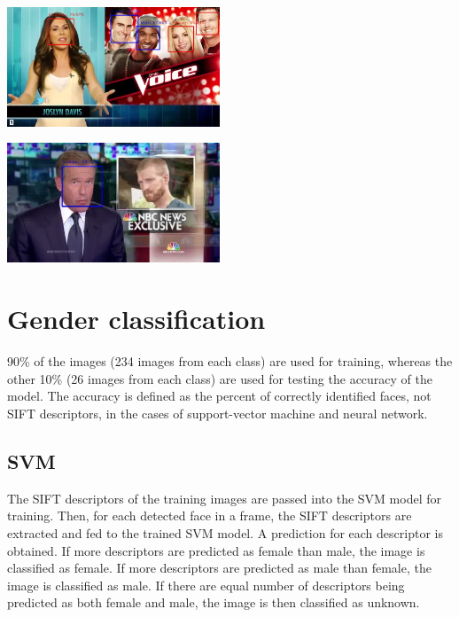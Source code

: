 \documentclass{article}
\begin{document}
\vspace*{10pt}
\begin{minipage}{0.5\linewidth}
 \label{fig: face_good}
\centering
\includegraphics[width=2.5in]{../output/clip_2/069.jpg}
\end{minipage}
\begin{minipage}{0.5\linewidth}
 \label{fig: face_bad}
\centering
\includegraphics[width=2.5in]{../output/clip_1_face/110.jpg}
\end{minipage}
\vspace*{10pt}

\section{Gender classification}
90\% of the images (234 images from each class) are used for training, whereas the other 10\% (26 images from each class) are used for testing the accuracy of the model. The accuracy is defined as the percent of correctly identified faces, not SIFT descriptors, in the cases of support-vector machine and neural network.

\subsection*{SVM}
The SIFT descriptors of the training images are passed into the SVM model for training.
Then, for each detected face in a frame, the SIFT descriptors are extracted and fed to the trained SVM model. A prediction for each descriptor is obtained. If more descriptors are predicted as female than male, the image is classified as female. If more descriptors are predicted as male than female, the image is classified as male. If there are equal number of descriptors being predicted as both female and male, the image is then classified as unknown.
\end{document}

